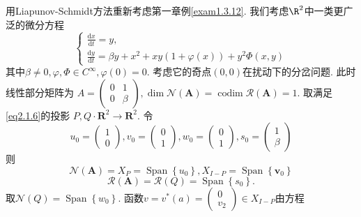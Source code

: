 \begin{example}
\label{exam2.1.6}  
用Liapunov-Schmidt方法重新考虑第一章例\ref{exam1.3.12}.
我们考虑\(\R ^{2}\)中一类更广泛的微分方程
\begin{equation}
  \label{exam2.1.13}
  \left\{
    \begin{array}{l}
      {\frac{\mathrm{d} x}{\mathrm{d} t}=y}, \\
      {\frac{\mathrm{d} y}{\mathrm{d} t}=\beta y+x^{2}+x y(1+\varphi(x))+y^{2} \Phi(x, y)}
    \end{array}
  \right.
\end{equation}
其中\(\beta \neq 0, \varphi, \Phi \in C^{\infty}, \varphi(0)=0\).
考虑它的奇点\((0,0)\)在扰动下的分岔问题.
此时线性部分矩阵为
\(
A=\left(
  \begin{array}{ll}
    {0} & {1} \\
    {0} & {\beta}
  \end{array}
\right),
\operatorname{dim} \mathscr{N}(\boldsymbol{A})=\operatorname{codim} \mathscr{R}(\boldsymbol{A})=1.
\)
取满足\eqref{eq2.1.6}的投影
\(P, Q \cdot \mathbf{R}^{2} \rightarrow \mathbf{R}^{2}\).
令
\begin{equation*}
u_{0}=\left( \begin{array}{l}{1} \\ {0}\end{array}\right), v_{0}=\left( \begin{array}{l}{0} \\ {1}\end{array}\right), w_{0}=\left( \begin{array}{l}{0} \\ {1}\end{array}\right), s_{0}=\left( \begin{array}{l}{1} \\ {\beta}\end{array}\right)
\end{equation*}
则
\begin{equation*}
\mathscr{N}(\boldsymbol{A})=X_{P}=\operatorname{Span}\left\{u_{0}\right\}, X_{I-P}=\operatorname{Span}\left\{\boldsymbol{v}_{0}\right\}
\end{equation*}
\begin{equation*}
  \mathscr{R}(\boldsymbol{A})=\mathscr{R}(Q)=\operatorname{Span}\left\{s_{0}\right\}.
\end{equation*}
取\(\mathscr{N}(Q)=\operatorname{Span}\left\{w_{0}\right\}\).
函数\(v=v^{*}(a)=\left( \begin{array}{l}{0} \\ {v_{2}}\end{array}\right) \in X_{I-P}\)由方程

\end{example}
